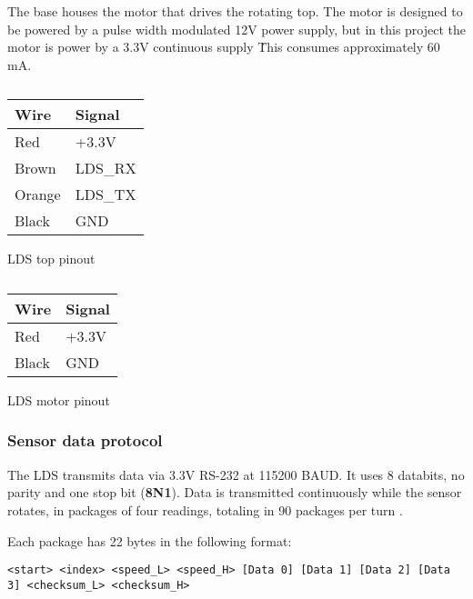 \documentclass[Main]{subfiles}
\begin{document}
		The base houses the motor that drives the rotating top.
		The motor is designed to be powered by a pulse width modulated 12V power supply, but in this project the motor is power by a 3.3V continuous supply \.
		This consumes approximately 60 mA.

		\begin{table}[H]
			\begin{subtable}[b]{0.5\linewidth}
				\centering
					\begin{tabular}{|l|l|}
					\hline
					{\bf Wire} & {\bf Signal} \\ \hline
					Red        & +3.3V        \\ \hline
					Brown      & LDS\_RX      \\ \hline
					Orange     & LDS\_TX      \\ \hline
					Black      & GND          \\ \hline
				\end{tabular}
				\caption{LDS top pinout}
				\label{tab:lds_top}
			\end{subtable}
			\begin{subtable}[b]{0.5\linewidth}
				\centering
				\begin{tabular}{|l|l|}
					\hline
					{\bf Wire} & {\bf Signal} \\ \hline
					Red        & +3.3V        \\ \hline
					Black      & GND          \\ \hline
				\end{tabular}
				\caption{LDS motor pinout}
				\label{tab:lds_motor}
			\end{subtable}
			\caption{}
		\end{table}

		\newpage
		\subsubsection{Sensor data protocol} %
		\label{ssub:sensor_communication_protocol}
			The LDS transmits data via 3.3V RS-232 at 115200 BAUD.
			It uses 8 databits, no parity and one stop bit (\textbf{8N1}).
			Data is transmitted continuously while the sensor rotates, in packages of four readings, totaling in 90 packages per turn \cite{OpenSource}.

			Each package has 22 bytes in the following format:

			{\footnotesize\texttt{<start> <index> <speed\_L> <speed\_H> [Data 0] [Data 1] [Data 2] [Data 3] <checksum\_L> <checksum\_H>}}
\end{document}
